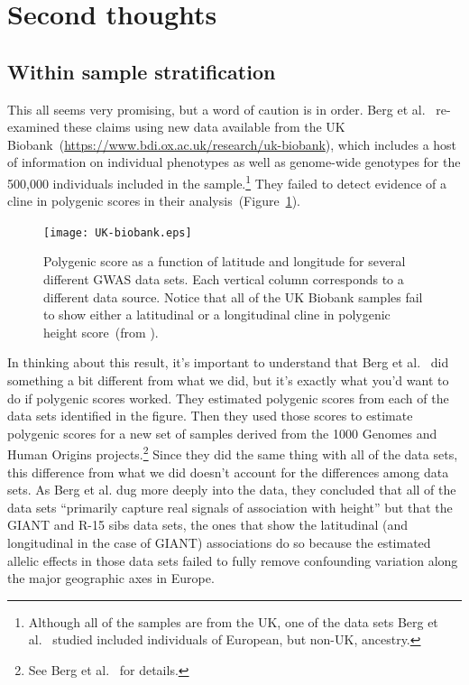 \section*{Second thoughts}

\subsection*{Within sample stratification}

This all seems very promising, but a word of caution is in order. Berg
et al.~\cite{Berg-etal-2018} re-examined these claims using new data
available from the UK
Biobank~(\url{https://www.bdi.ox.ac.uk/research/uk-biobank}), which
includes a host of information on individual phenotypes as well as
genome-wide genotypes for the 500,000 individuals included in the
sample.\footnote{Although all of the samples are from the UK, one of
  the data sets Berg et al.~\cite{Berg-etal-2018} studied included
  individuals of European, but non-UK, ancestry.} They failed to
detect evidence of a cline in polygenic scores in their
analysis~(Figure~\ref{fig:UK-biobank}).

\begin{figure}
  \begin{center}
    \texttt{[image: UK-biobank.eps]}
  \end{center}
  \caption{Polygenic score as a function of latitude and longitude for
    several different GWAS data sets. Each vertical column corresponds
  to a different data source. Notice that all of the UK Biobank
  samples fail to show either a latitudinal or a longitudinal cline in
  polygenic height score~(from \cite{Berg-etal-2018}).}\label{fig:UK-biobank} 
\end{figure}

In thinking about this result, it's important to understand that Berg
et al.~\cite{Berg-etal-2018} did something a bit different from what
we did, but it's exactly what you'd want to do if polygenic scores
worked. They estimated polygenic scores from each of the data sets
identified in the figure. Then they used those scores to estimate
polygenic scores for a new set of samples derived from the 1000
Genomes and Human Origins projects.\footnote{See Berg et
  al.~\cite{Berg-etal-2018} for details.} Since they did the same
thing with all of the data sets, this difference from what we did
doesn't account for the differences among data sets. As Berg et
al. dug more deeply into the data, they concluded that all of the data
sets ``primarily capture real signals of association with height'' but
that the GIANT and R-15 sibs data sets, the ones that show the
latitudinal (and longitudinal in the case of GIANT) associations do so
because the estimated allelic effects in those data sets failed to
fully remove confounding variation along the major geographic axes in
Europe.


